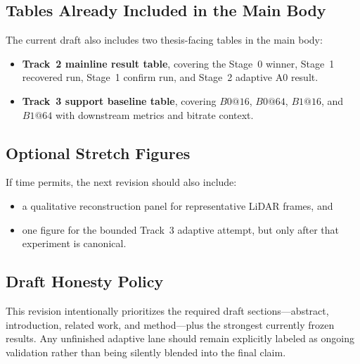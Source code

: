 \subsection{Tables Already Included in the Main Body}
The current draft also includes two thesis-facing tables in the main body:
\begin{itemize}
\item \textbf{Track~2 mainline result table}, covering the Stage~0 winner, Stage~1 recovered run, Stage~1 confirm run, and Stage~2 adaptive A0 result.
\item \textbf{Track~3 support baseline table}, covering \(B0@16\), \(B0@64\), \(B1@16\), and \(B1@64\) with downstream metrics and bitrate context.
\end{itemize}

\subsection{Optional Stretch Figures}
If time permits, the next revision should also include:
\begin{itemize}
\item a qualitative reconstruction panel for representative LiDAR frames, and
\item one figure for the bounded Track~3 adaptive attempt, but only after that experiment is canonical.
\end{itemize}

\subsection{Draft Honesty Policy}
This revision intentionally prioritizes the required draft sections---abstract, introduction, related work, and method---plus the strongest currently frozen results. Any unfinished adaptive lane should remain explicitly labeled as ongoing validation rather than being silently blended into the final claim.
